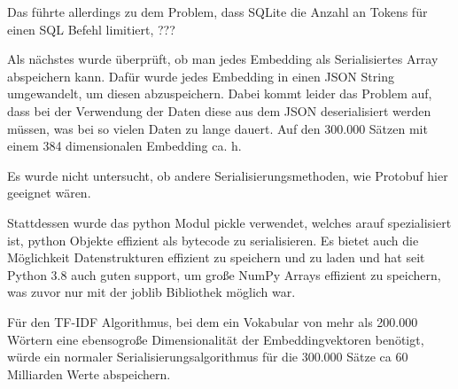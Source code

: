 Das führte allerdings zu dem Problem, dass SQLite die Anzahl an Tokens für einen SQL Befehl limitiert, ???

Als nächstes wurde überprüft, ob man jedes Embedding als Serialisiertes Array abspeichern kann.
Dafür wurde jedes Embedding in einen JSON String umgewandelt, um diesen abzuspeichern. 
Dabei kommt leider das Problem auf, dass bei der Verwendung der Daten diese aus dem JSON deserialisiert werden müssen, was bei so vielen Daten zu lange dauert.
Auf den 300.000 Sätzen mit einem 384 dimensionalen Embedding ca. h.

Es wurde nicht untersucht, ob andere Serialisierungsmethoden, wie Protobuf hier geeignet wären.

Stattdessen wurde das python Modul pickle verwendet, welches arauf spezialisiert ist, python Objekte effizient als bytecode zu serialisieren. 
Es bietet auch die Möglichkeit Datenstrukturen effizient zu speichern und zu laden und hat seit Python 3.8 auch guten support, um große NumPy Arrays effizient zu speichern, was zuvor nur mit der joblib Bibliothek möglich war.

Für den TF-IDF Algorithmus, bei dem ein Vokabular von mehr als 200.000 Wörtern eine ebensogroße Dimensionalität der Embeddingvektoren benötigt, würde ein normaler Serialisierungsalgorithmus für die 300.000 Sätze ca 60 Milliarden Werte abspeichern.

